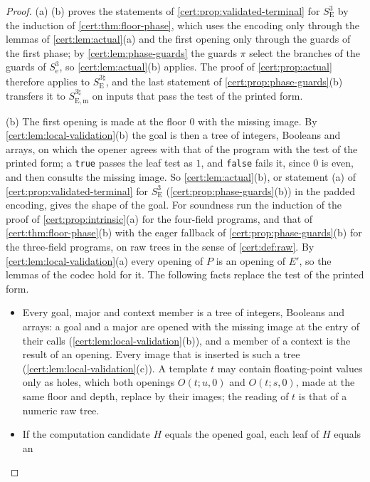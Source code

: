 \begin{proof}
(a) (b) proves the statements of \cref{cert:prop:validated-terminal}
for $S^{3}_{\mathrm E}$ by the induction of \cref{cert:thm:floor-phase}, which uses the encoding
only through the lemmas of \cref{cert:lem:actual}(a) and the first opening only through the
guards of the first phase; by \cref{cert:lem:phase-guards} the guards $\pi$ select the branches
of the guards of $S^{3}_{\mathrm e}$, so \cref{cert:lem:actual}(b) applies. The proof of
\cref{cert:prop:actual} therefore applies to $S^{3\natural}_{\mathrm E}$, and the last statement of
\cref{cert:prop:phase-guards}(b) transfers it to $S^{3\natural}_{\mathrm{E,m}}$ on inputs that pass
the test of the printed form.

(b) The first opening is made at the floor $0$ with the missing image. By
\cref{cert:lem:local-validation}(b) the goal is then a tree of integers, Booleans and arrays, on
which the opener agrees with that of the program with the test of the printed form; a
\texttt{true} passes the leaf test as $1$, and \texttt{false} fails it, since $0$ is even, and
then consults the missing image. So \cref{cert:lem:actual}(b), or statement (a) of
\cref{cert:prop:validated-terminal} for $S^{3}_{\mathrm E}$ (\cref{cert:prop:phase-guards}(b)) in
the padded encoding, gives the shape of the goal. For soundness run the induction of the proof
of \cref{cert:prop:intrinsic}(a) for the four-field programs, and that of
\cref{cert:thm:floor-phase}(b) with the eager fallback of \cref{cert:prop:phase-guards}(b) for the
three-field programs, on raw trees in the sense of \cref{cert:def:raw}. By
\cref{cert:lem:local-validation}(a) every opening of $P$ is an opening of $E'$, so the lemmas of
the codec hold for it. The following facts replace the test of the printed form.
\begin{itemize}
\item Every goal, major and context member is a tree of integers, Booleans and arrays: a goal
and a major are opened with the missing image at the entry of their calls
(\cref{cert:lem:local-validation}(b)), and a member of a context is the result of an opening.
Every image that is inserted is such a tree (\cref{cert:lem:local-validation}(c)). A template
$t$ may contain floating-point values only as holes, which both openings $O(t;u,0)$ and
$O(t;s,0)$, made at the same floor and depth, replace by their images; the reading of $t$ is
that of a numeric raw tree.
\item If the computation candidate $H$ equals the opened goal, each leaf of $H$ equals an

\end{itemize}
\end{proof}
